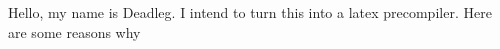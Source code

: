 \documentclass{article}
\begin{document}
Hello, my name is Deadleg. I intend to turn this into a latex precompiler. Here are some reasons why
\end{document}
